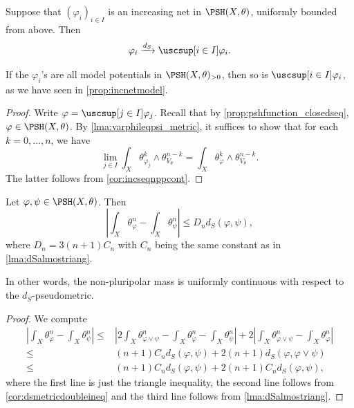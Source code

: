 \begin{corollary}\label{cor:incnetdSconv}
    Suppose that $(\varphi_i)_{i\in I}$ is an increasing net in $\PSH(X,\theta)$, uniformly bounded from above. Then
    \[
        \varphi_i\xrightarrow{d_S} \uscsup[i\in I]\varphi_i.
    \]
\end{corollary}
If the $\varphi_i$'s are all model potentials in $\PSH(X,\theta)_{>0}$, then so is $\uscsup[i\in I]\varphi_i$, as we have seen in \cref{prop:incnetmodel}.
\begin{proof}
    Write $\varphi=\uscsup[j\in I]\varphi_j$. Recall that by \cref{prop:pshfunction_closedseq}, $\varphi\in \PSH(X,\theta)$.
    By \cref{lma:varphileqpsi_metric}, it suffices to show that for each $k=0,\ldots,n$, we have
    \[
        \lim_{j\in I}\int_X \theta_{\varphi_j}^k\wedge \theta_{V_{\theta}}^{n-k} =  \int_X \theta_{\varphi}^k\wedge \theta_{V_{\theta}}^{n-k}.
    \]
    The latter follows from \cref{cor:incseqnppcont}.
\end{proof}

\begin{corollary}\label{cor:massdiffdS}
    Let $\varphi,\psi\in \PSH(X,\theta)$. Then
    \[
    \left| \int_X \theta_{\varphi}^n-\int_X \theta_{\psi}^n \right|\leq D_n d_S(\varphi,\psi),
    \]
    where $D_n=3(n+1)C_n$ with $C_n$ being the same constant as in \cref{lma:dSalmostriang}.
\end{corollary}
In other words, the non-pluripolar mass is uniformly continuous with respect to the $d_S$-pseudometric.
\begin{proof}
    We compute
    \[
    \begin{aligned}
        \left| \int_X \theta_{\varphi}^n-\int_X \theta_{\psi}^n \right|\leq & \left|2\int_X \theta_{\varphi\lor \psi}^n-\int_X \theta_{\varphi}^n-\int_X \theta_{\psi}^n\right| + 2\left| \int_X \theta_{\varphi\lor \psi}^n-\int_X \theta_{\varphi}^n\right|\\
        \leq &  (n+1)C_n d_S(\varphi,\psi)+2(n+1) d_S(\varphi,\varphi\lor \psi)\\
        \leq & (n+1)C_n d_S(\varphi,\psi)+2(n+1)C_n d_S(\varphi,\psi),
    \end{aligned}
    \]
    where the first line is just the triangle inequality, the second line follows from \cref{cor:dsmetricdoubleineq} and the third line follows from \cref{lma:dSalmostriang}.
\end{proof}

